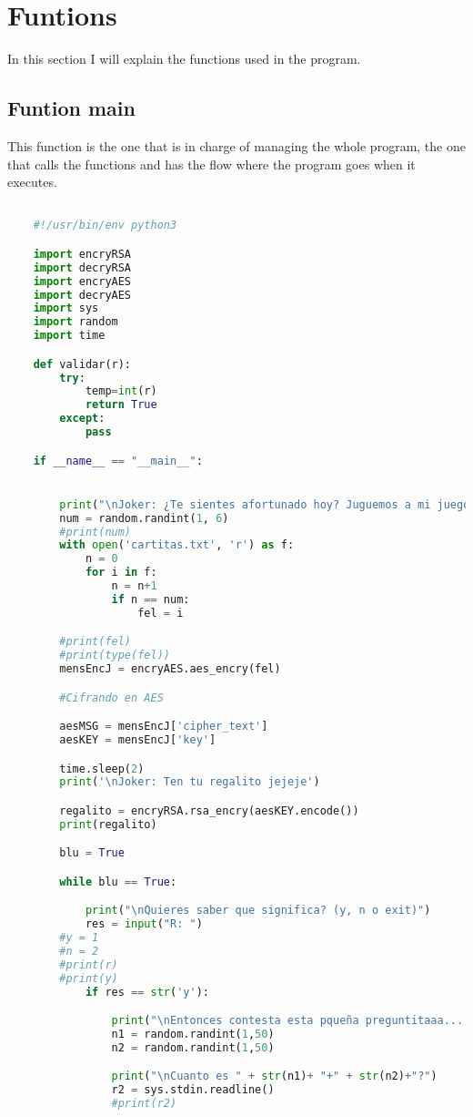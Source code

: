\documentclass[a4paper, table,12pt,xcdraw]{article} %
\begin{document}
	\section{Funtions}

	In this section I will explain the functions used in the program.

	\subsection{Funtion main}
	This function is the one that is in charge of managing the whole program, the one that calls the functions and has the flow where the program goes when it executes.

	\begin{lstlisting}[language=python,caption=main]

	#!/usr/bin/env python3

	import encryRSA
	import decryRSA
	import encryAES
	import decryAES
	import sys
	import random
	import time

	def validar(r):
		try:
			temp=int(r)
			return True
		except:
			pass

	if __name__ == "__main__":


		print("\nJoker: ¿Te sientes afortunado hoy? Juguemos a mi juego preferido, la ruleta rusa. Si te vuelas la cabeza… ¡Ganas!\nEspera!..... Cumples años hoy? vaya vaya\nTe tengo una sorpresa....")
		num = random.randint(1, 6)
		#print(num)
		with open('cartitas.txt', 'r') as f:
			n = 0
			for i in f:
				n = n+1
				if n == num:
					fel = i

		#print(fel)
		#print(type(fel))
		mensEncJ = encryAES.aes_encry(fel)

		#Cifrando en AES

		aesMSG = mensEncJ['cipher_text']
		aesKEY = mensEncJ['key']

		time.sleep(2)
		print('\nJoker: Ten tu regalito jejeje')

		regalito = encryRSA.rsa_encry(aesKEY.encode())
		print(regalito)

		blu = True

		while blu == True:

			print("\nQuieres saber que significa? (y, n o exit)")
			res = input("R: ")
		#y = 1
		#n = 2
		#print(r)
		#print(y)
			if res == str('y'):

				print("\nEntonces contesta esta pqueña preguntitaaa....")
				n1 = random.randint(1,50)
				n2 = random.randint(1,50)

				print("\nCuanto es " + str(n1)+ "+" + str(n2)+"?")
				r2 = sys.stdin.readline()
				#print(r2)


\end{lstlisting}
\end{document}
